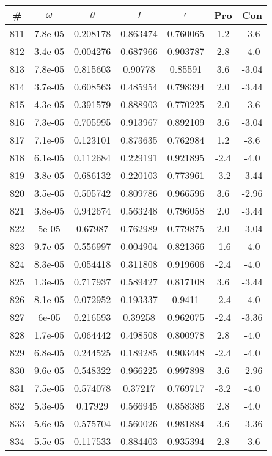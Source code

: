 \begin{table}
\begin{tabular}{c|c|c|c|c|c|c}
\# & $\omega$ & $\theta$ & $I$ & $\epsilon$ & Pro & Con\\
\hline
811 & 7.8e-05 & 0.208178 & 0.863474 & 0.760065 & 1.2 & -3.6\\
812 & 3.4e-05 & 0.004276 & 0.687966 & 0.903787 & 2.8 & -4.0\\
813 & 7.8e-05 & 0.815603 & 0.90778 & 0.85591 & 3.6 & -3.04\\
814 & 3.7e-05 & 0.608563 & 0.485954 & 0.798394 & 2.0 & -3.44\\
815 & 4.3e-05 & 0.391579 & 0.888903 & 0.770225 & 2.0 & -3.6\\
816 & 7.3e-05 & 0.705995 & 0.913967 & 0.892109 & 3.6 & -3.04\\
817 & 7.1e-05 & 0.123101 & 0.873635 & 0.762984 & 1.2 & -3.6\\
818 & 6.1e-05 & 0.112684 & 0.229191 & 0.921895 & -2.4 & -4.0\\
819 & 3.8e-05 & 0.686132 & 0.220103 & 0.773961 & -3.2 & -3.44\\
820 & 3.5e-05 & 0.505742 & 0.809786 & 0.966596 & 3.6 & -2.96\\
821 & 3.8e-05 & 0.942674 & 0.563248 & 0.796058 & 2.0 & -3.44\\
822 & 5e-05 & 0.67987 & 0.762989 & 0.779875 & 2.0 & -3.04\\
823 & 9.7e-05 & 0.556997 & 0.004904 & 0.821366 & -1.6 & -4.0\\
824 & 8.3e-05 & 0.054418 & 0.311808 & 0.919606 & -2.4 & -4.0\\
825 & 1.3e-05 & 0.717937 & 0.589427 & 0.817108 & 3.6 & -3.44\\
826 & 8.1e-05 & 0.072952 & 0.193337 & 0.9411 & -2.4 & -4.0\\
827 & 6e-05 & 0.216593 & 0.39258 & 0.962075 & -2.4 & -3.36\\
828 & 1.7e-05 & 0.064442 & 0.498508 & 0.800978 & 2.8 & -4.0\\
829 & 6.8e-05 & 0.244525 & 0.189285 & 0.903448 & -2.4 & -4.0\\
830 & 9.6e-05 & 0.548322 & 0.966225 & 0.997898 & 3.6 & -2.96\\
831 & 7.5e-05 & 0.574078 & 0.37217 & 0.769717 & -3.2 & -4.0\\
832 & 5.3e-05 & 0.17929 & 0.566945 & 0.858386 & 2.8 & -4.0\\
833 & 5.6e-05 & 0.575704 & 0.560026 & 0.981884 & 3.6 & -3.36\\
834 & 5.5e-05 & 0.117533 & 0.884403 & 0.935394 & 2.8 & -3.6\\

\end{tabular}
\end{table}
